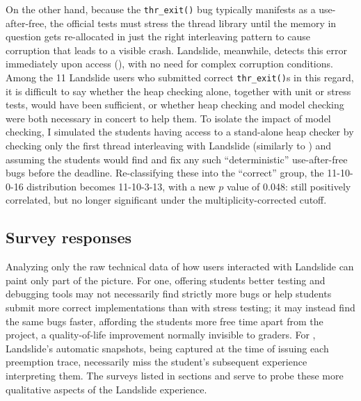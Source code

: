 On the other hand, because the {\tt thr\_exit()} bug typically manifests as a use-after-free,
the official tests must stress the thread library until the memory in question gets re-allocated
in just the right interleaving pattern to cause corruption that leads to a visible crash.
Landslide, meanwhile, detects this error immediately upon access (\sect{\ref{sec:landslide-valgrind-mode}}),
with no need for complex corruption conditions.
Among the 11 Landslide users who submitted correct {\tt thr\_exit()}s in this regard,
it is difficult to say whether the heap checking alone, together with unit or stress tests,
would have been sufficient,
or whether heap checking and model checking were both necessary in concert to help them.
To isolate the impact of model checking,
I simulated the students having access to a stand-alone heap checker
by checking only the first thread interleaving with Landslide
(similarly to \sect{\ref{sec:quicksand-eval}})
and assuming the students would find and fix any such ``deterministic'' use-after-free bugs before the deadline.
Re-classifying these into the ``correct'' group,
the 11-10-0-16 distribution becomes
11-10-3-13,
with a new $p$ value of 0.048:
still positively correlated, but no longer significant under the multiplicity-corrected cutoff.

\subsection{Survey responses}
\label{sec:education-eval-survey}

Analyzing only the raw technical data of how users interacted with Landslide can paint only part of the picture.
For one, offering students better testing and debugging tools
may not necessarily find strictly more bugs or help students submit more correct implementations
than with stress testing;
it may instead find the same bugs faster,
affording the students more free time apart from the project,
a quality-of-life improvement normally invisible to graders.
For , Landslide's automatic snapshots, being captured at the time of issuing each preemption trace,
necessarily miss the student's subsequent experience interpreting them.
The surveys listed in sections \sect{\ref{sec:education-survey-pebbles}} and \sect{\ref{sec:education-survey-pintos}}
serve to probe these more qualitative aspects of the Landslide experience.


